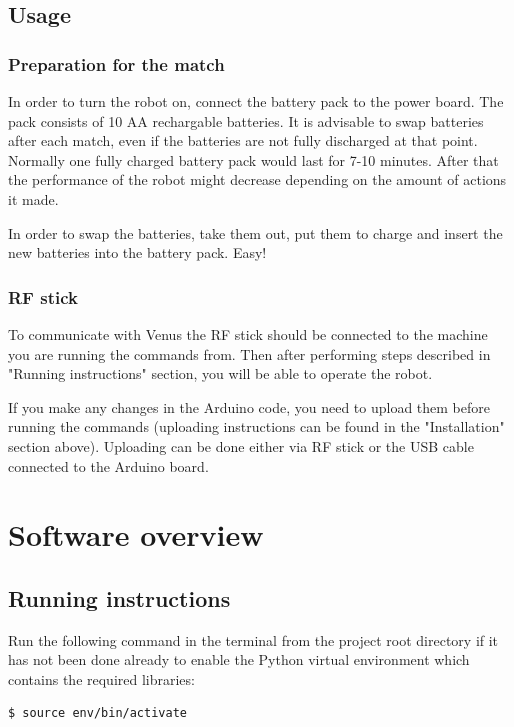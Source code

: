 \documentclass[a4paper,12pt]{article}
\begin{document}
\subsection{Usage}

\subsubsection{Preparation for the match}

In order to turn the robot on, connect the battery pack to the power board. The pack consists of 10 AA rechargable batteries. It is advisable to swap batteries after each match, even if the batteries are not fully discharged at that point. Normally one fully charged battery pack would last for 7-10 minutes. After that the performance of the robot might decrease depending on the amount of actions it made. 

In order to swap the batteries, take them out, put them to charge and insert the new batteries into the battery pack. Easy!

\subsubsection{RF stick}
To communicate with Venus the RF stick should be connected to the machine you are running the commands from. Then after performing steps described in "Running instructions" section, you will be able to operate the robot.

If you make any changes in the Arduino code, you need to upload them before running the commands (uploading instructions can be found in the "Installation" section above). Uploading can be done either via RF stick or the USB cable connected to the Arduino board. 

\section{Software overview}

\subsection{Running instructions}

Run the following command in the terminal from the project root directory if it has not been done already to enable the Python virtual environment which contains the required libraries:
\begin{lstlisting}
$ source env/bin/activate
\end{lstlisting}
\end{document}
